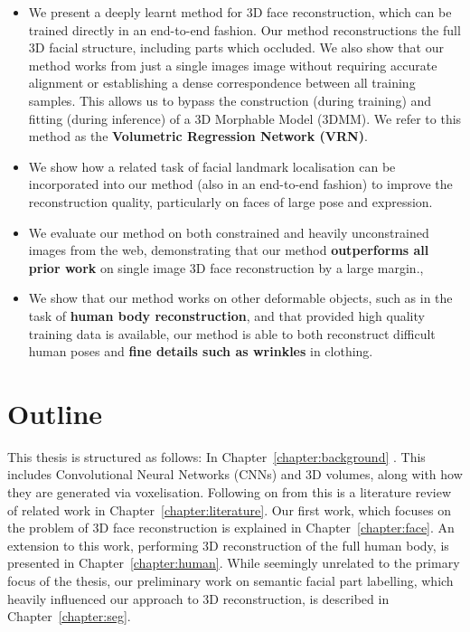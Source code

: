 \begin{itemize}
\item %
  We present a deeply learnt method for 3D face reconstruction, which
  can be trained directly in an end-to-end fashion. Our method
  reconstructions the full 3D facial structure, including parts which
  occluded. We also show that our method works from just a single
  images image without requiring accurate alignment or establishing a
  dense correspondence between all training samples.  This allows us
  to bypass the construction (during training) and fitting (during
  inference) of a 3D Morphable Model (3DMM).  We refer to this method
  as the \textbf{Volumetric Regression Network (VRN)}.

\item %
  We show how a related task of facial landmark localisation can be
  incorporated into our method (also in an end-to-end fashion) to
  improve the reconstruction quality, particularly on faces of large
  pose and expression.

\item We evaluate our method on both constrained and heavily
  unconstrained images from the web, demonstrating that our method
  \textbf{outperforms all prior work} on single image 3D face
  reconstruction by a large margin.,

\item We show that our method works on other deformable objects, such
  as in the task of \textbf{human body reconstruction}, and that
  provided high quality training data is available, our method is able
  to both reconstruct difficult human poses and \textbf{fine details
    such as wrinkles} in clothing.

\end{itemize}

\section{Outline} This thesis is structured as follows: In
Chapter~\ref{chapter:background} . This includes Convolutional
Neural Networks (CNNs) and 3D volumes, along with how they are
generated via voxelisation. Following on from this is a literature
review of related work in Chapter~\ref{chapter:literature}. Our first
work, which focuses on the problem of 3D face reconstruction is
explained in Chapter~\ref{chapter:face}. An extension to this work,
performing 3D reconstruction of the full human body, is presented in
Chapter~\ref{chapter:human}. While seemingly unrelated to the primary
focus of the thesis, our preliminary work on semantic facial part
labelling, which heavily influenced our approach to 3D reconstruction,
is described in Chapter~\ref{chapter:seg}.




